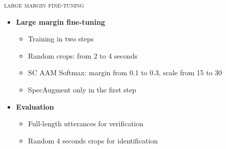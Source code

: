 \documentclass[10pt,aspectratio=1610,professionalfont]{beamer}
\begin{document}
\begin{frame}{\textsc{large margin fine-tuning}}
\center
    \begin{itemize}
        \item \textbf{Large margin fine-tuning} 
        \begin{itemize}
	     \item Training in two steps
            \item Random crops: from 2 to 4 seconds
		\item SC AAM Softmax: margin from 0.1 to 0.3, scale from 15 to 30
		\item SpecAugment only in the first step
        \end{itemize} 
        \item \textbf{Evaluation}
	 \begin{itemize}
            \item Full-length utterances for verification
		\item Random 4 seconds crops for identification
        \end{itemize}
    \end{itemize}
\end{frame}
\end{document}
